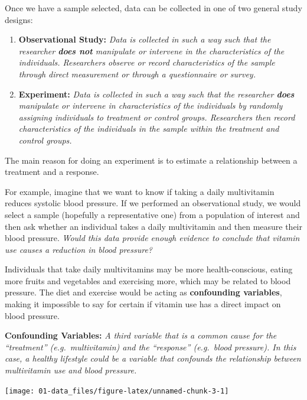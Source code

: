 \documentclass[
]{book}
\begin{document}
Once we have a sample selected, data can be collected in one of two general study designs:

\begin{enumerate}
\def\labelenumi{\arabic{enumi}.}
\item
  \textbf{Observational Study:} \emph{Data is collected in such a way such that the researcher \textbf{does not} manipulate or intervene in the characteristics of the individuals. Researchers observe or record characteristics of the sample through direct measurement or through a questionnaire or survey.}
\item
  \textbf{Experiment:} \emph{Data is collected in such a way such that the researcher \textbf{does} manipulate or intervene in characteristics of the individuals by randomly assigning individuals to treatment or control groups. Researchers then record characteristics of the individuals in the sample within the treatment and control groups.}
\end{enumerate}

The main reason for doing an experiment is to estimate a relationship between a treatment and a response.

For example, imagine that we want to know if taking a daily multivitamin reduces systolic blood pressure. If we performed an observational study, we would select a sample (hopefully a representative one) from a population of interest and then ask whether an individual takes a daily multivitamin and then measure their blood pressure. \emph{Would this data provide enough evidence to conclude that vitamin use causes a reduction in blood pressure?}

Individuals that take daily multivitamins may be more health-conscious, eating more fruits and vegetables and exercising more, which may be related to blood pressure. The diet and exercise would be acting as \textbf{confounding variables}, making it impossible to say for certain if vitamin use has a direct impact on blood pressure.

\textbf{Confounding Variables:} \emph{A third variable that is a common cause for the ``treatment'' (e.g.~multivitamin) and the ``response'' (e.g.~blood pressure). In this case, a healthy lifestyle could be a variable that confounds the relationship between multivitamin use and blood pressure.}

\begin{center}\texttt{[image: 01-data\_files/figure-latex/unnamed-chunk-3-1]} \end{center}
\end{document}

